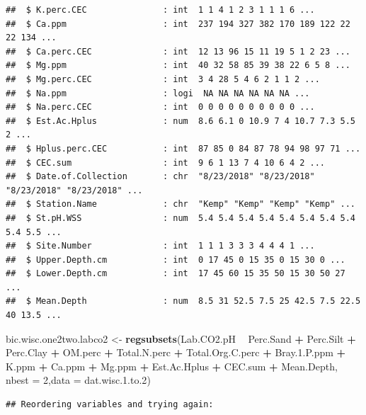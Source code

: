 \documentclass[]{article}
\newenvironment{Shaded}{\begin{snugshade}}{\end{snugshade}}
\newcommand{\DataTypeTok}[1]{\textcolor[rgb]{0.13,0.29,0.53}{#1}}
\newcommand{\DecValTok}[1]{\textcolor[rgb]{0.00,0.00,0.81}{#1}}
\newcommand{\FloatTok}[1]{\textcolor[rgb]{0.00,0.00,0.81}{#1}}
\newcommand{\KeywordTok}[1]{\textcolor[rgb]{0.13,0.29,0.53}{\textbf{#1}}}
\newcommand{\NormalTok}[1]{#1}
\newcommand{\OperatorTok}[1]{\textcolor[rgb]{0.81,0.36,0.00}{\textbf{#1}}}
\newcommand{\StringTok}[1]{\textcolor[rgb]{0.31,0.60,0.02}{#1}}
\begin{document}
\begin{verbatim}
##  $ K.perc.CEC               : int  1 1 4 1 2 3 1 1 1 6 ...
##  $ Ca.ppm                   : int  237 194 327 382 170 189 122 22 22 134 ...
##  $ Ca.perc.CEC              : int  12 13 96 15 11 19 5 1 2 23 ...
##  $ Mg.ppm                   : int  40 32 58 85 39 38 22 6 5 8 ...
##  $ Mg.perc.CEC              : int  3 4 28 5 4 6 2 1 1 2 ...
##  $ Na.ppm                   : logi  NA NA NA NA NA NA ...
##  $ Na.perc.CEC              : int  0 0 0 0 0 0 0 0 0 0 ...
##  $ Est.Ac.Hplus             : num  8.6 6.1 0 10.9 7 4 10.7 7.3 5.5 2 ...
##  $ Hplus.perc.CEC           : int  87 85 0 84 87 78 94 98 97 71 ...
##  $ CEC.sum                  : int  9 6 1 13 7 4 10 6 4 2 ...
##  $ Date.of.Collection       : chr  "8/23/2018" "8/23/2018" "8/23/2018" "8/23/2018" ...
##  $ Station.Name             : chr  "Kemp" "Kemp" "Kemp" "Kemp" ...
##  $ St.pH.WSS                : num  5.4 5.4 5.4 5.4 5.4 5.4 5.4 5.4 5.4 5.5 ...
##  $ Site.Number              : int  1 1 1 3 3 3 4 4 4 1 ...
##  $ Upper.Depth.cm           : int  0 17 45 0 15 35 0 15 30 0 ...
##  $ Lower.Depth.cm           : int  17 45 60 15 35 50 15 30 50 27 ...
##  $ Mean.Depth               : num  8.5 31 52.5 7.5 25 42.5 7.5 22.5 40 13.5 ...
\end{verbatim}

\begin{Shaded}
\begin{Highlighting}[]
\NormalTok{bic.wisc.one2two.labco2 <-}\StringTok{ }\KeywordTok{regsubsets}\NormalTok{(Lab.CO2.pH }\OperatorTok{~}\StringTok{ }\NormalTok{Perc.Sand }\OperatorTok{+}\StringTok{ }\NormalTok{Perc.Silt }\OperatorTok{+}\StringTok{ }\NormalTok{Perc.Clay }\OperatorTok{+}\StringTok{ }\NormalTok{OM.perc }\OperatorTok{+}\StringTok{ }\NormalTok{Total.N.perc }\OperatorTok{+}\StringTok{ }\NormalTok{Total.Org.C.perc }\OperatorTok{+}\StringTok{ }\NormalTok{Bray.}\FloatTok{1.}\NormalTok{P.ppm }\OperatorTok{+}\StringTok{ }\NormalTok{K.ppm }\OperatorTok{+}\StringTok{ }\NormalTok{Ca.ppm }\OperatorTok{+}\StringTok{ }\NormalTok{Mg.ppm }\OperatorTok{+}\StringTok{ }\NormalTok{Est.Ac.Hplus }\OperatorTok{+}\StringTok{ }\NormalTok{CEC.sum }\OperatorTok{+}\StringTok{ }\NormalTok{Mean.Depth, }\DataTypeTok{nbest =} \DecValTok{2}\NormalTok{,}\DataTypeTok{data =}\NormalTok{ dat.wisc.}\FloatTok{1.}\NormalTok{to}\FloatTok{.2}\NormalTok{)}
\end{Highlighting}
\end{Shaded}

\begin{verbatim}
## Reordering variables and trying again:
\end{verbatim}
\end{document}
